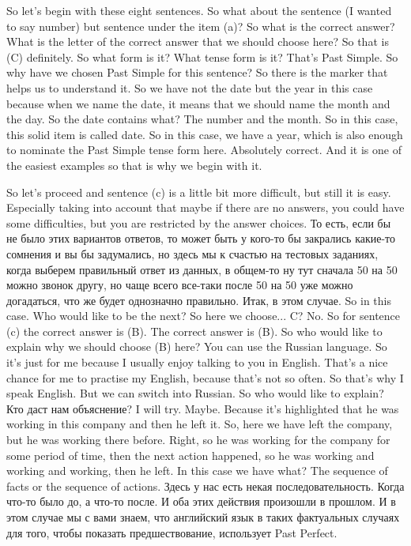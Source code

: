 \documentclass[main.tex]{subfiles}
\begin{document}
So let's begin with these eight sentences.
So what about the sentence (I wanted to say number) but sentence under the item (a)?
So what is the correct answer?
What is the letter of the correct answer that we should choose here?
So that is (C) definitely.
So what form is it?
What tense form is it?
That's Past Simple.
So why have we chosen Past Simple for this sentence?
So there is the marker that helps us to understand it.
So we have not the date but the year in this case because when we name the date, it means that we should name the month and the day.
So the date contains what?
The number and the month.
So in this case, this solid item is called date.
So in this case, we have a year, which is also enough to nominate the Past Simple tense form here.
Absolutely correct.
And it is one of the easiest examples so that is why we begin with it.

So let's proceed and sentence (c) is a little bit more difficult, but still it is easy.
Especially taking into account that maybe if there are no answers, you could have some difficulties, but you are restricted by the answer choices.
То есть, если бы не было этих вариантов ответов, то может быть у кого-то бы закрались какие-то сомнения и вы бы задумались, но здесь мы к счастью на тестовых заданиях, когда выберем правильный ответ из данных, в общем-то ну тут сначала 50 на 50 можно звонок другу, но чаще всего все-таки после 50 на 50 уже можно догадаться, что же будет однозначно правильно.
Итак, в этом случае.
So in this case.
Who would like to be the next?
So here we choose...
C?
No.
So for sentence (c) the correct answer is (B).
The correct answer is (B).
So who would like to explain why we should choose (B) here? You can use the Russian language.
So it's just for me because I usually enjoy talking to you in English.
That's a nice chance for me to practise my English, because that's not so often.
So that's why I speak English.
But we can switch into Russian.
So who would like to explain?
Кто даст нам объяснение?
I will try.
Maybe.
Because it's highlighted that he was working in this company and then he left it.
So, here we have left the company, but he was working there before.
Right, so he was working for the company for some period of time, then the next action happened, so he was working and working and working, then he left.
In this case we have what?
The sequence of facts or the sequence of actions.
Здесь у нас есть некая последовательность.
Когда что-то было до, а что-то после.
И оба этих действия произошли в прошлом.
И в этом случае мы с вами знаем, что английский язык в таких фактуальных случаях для того, чтобы показать предшествование, использует Past Perfect.
\end{document}
